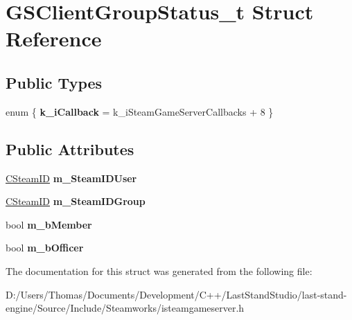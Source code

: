 \hypertarget{structGSClientGroupStatus__t}{}\section{G\+S\+Client\+Group\+Status\+\_\+t Struct Reference}
\label{structGSClientGroupStatus__t}
\subsection*{Public Types}
\begin{DoxyCompactItemize}
\item 
\hypertarget{structGSClientGroupStatus__t_ac20e4d1c01730453fe0547f955f29d6b}{}enum \{ {\bfseries k\+\_\+i\+Callback} = k\+\_\+i\+Steam\+Game\+Server\+Callbacks + 8
 \}\label{structGSClientGroupStatus__t_ac20e4d1c01730453fe0547f955f29d6b}

\end{DoxyCompactItemize}
\subsection*{Public Attributes}
\begin{DoxyCompactItemize}
\item 
\hypertarget{structGSClientGroupStatus__t_a8330bc23381be1a79337aa9982ae3280}{}\hyperlink{classCSteamID}{C\+Steam\+I\+D} {\bfseries m\+\_\+\+Steam\+I\+D\+User}\label{structGSClientGroupStatus__t_a8330bc23381be1a79337aa9982ae3280}

\item 
\hypertarget{structGSClientGroupStatus__t_a85f988b80b043141107879af5daf4cc7}{}\hyperlink{classCSteamID}{C\+Steam\+I\+D} {\bfseries m\+\_\+\+Steam\+I\+D\+Group}\label{structGSClientGroupStatus__t_a85f988b80b043141107879af5daf4cc7}

\item 
\hypertarget{structGSClientGroupStatus__t_a0ef7c9a3c893359ae991b79dc58bd7da}{}bool {\bfseries m\+\_\+b\+Member}\label{structGSClientGroupStatus__t_a0ef7c9a3c893359ae991b79dc58bd7da}

\item 
\hypertarget{structGSClientGroupStatus__t_a5e173d80981816b8f820813d0751e3d3}{}bool {\bfseries m\+\_\+b\+Officer}\label{structGSClientGroupStatus__t_a5e173d80981816b8f820813d0751e3d3}

\end{DoxyCompactItemize}


The documentation for this struct was generated from the following file\+:\begin{DoxyCompactItemize}
\item 
D\+:/\+Users/\+Thomas/\+Documents/\+Development/\+C++/\+Last\+Stand\+Studio/last-\/stand-\/engine/\+Source/\+Include/\+Steamworks/isteamgameserver.\+h\end{DoxyCompactItemize}
